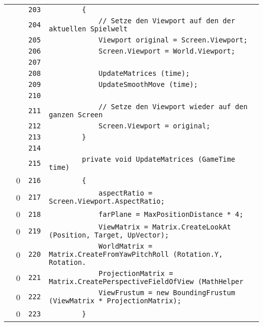 \documentclass[a4paper,10pt]{article}
\begin{document}
\begin{longtable}[l]{lrrl}
\cellcolor{gray} &  & \verb~203~ & \verb~        {~\\
\cellcolor{gray} &  & \verb~204~ & \verb~            // Setze den Viewport auf den der aktuellen Spielwelt~\\
\cellcolor{gray} &  & \verb~205~ & \verb~            Viewport original = Screen.Viewport;~\\
\cellcolor{gray} &  & \verb~206~ & \verb~            Screen.Viewport = World.Viewport;~\\
\cellcolor{gray} &  & \verb~207~ & \verb~~\\
\cellcolor{gray} &  & \verb~208~ & \verb~            UpdateMatrices (time);~\\
\cellcolor{gray} &  & \verb~209~ & \verb~            UpdateSmoothMove (time);~\\
\cellcolor{gray} &  & \verb~210~ & \verb~~\\
\cellcolor{gray} &  & \verb~211~ & \verb~            // Setze den Viewport wieder auf den ganzen Screen~\\
\cellcolor{gray} &  & \verb~212~ & \verb~            Screen.Viewport = original;~\\
\cellcolor{gray} &  & \verb~213~ & \verb~        }~\\
\cellcolor{gray} &  & \verb~214~ & \verb~~\\
\cellcolor{gray} &  & \verb~215~ & \verb~        private void UpdateMatrices (GameTime time)~\\
\cellcolor{red} & 0 & \verb~216~ & \verb~        {~\\
\cellcolor{red} & 0 & \verb~217~ & \verb~            aspectRatio = Screen.Viewport.AspectRatio;~\\
\cellcolor{red} & 0 & \verb~218~ & \verb~            farPlane = MaxPositionDistance * 4;~\\
\cellcolor{red} & 0 & \verb~219~ & \verb~            ViewMatrix = Matrix.CreateLookAt (Position, Target, UpVector);~\\
\cellcolor{red} & 0 & \verb~220~ & \verb~            WorldMatrix = Matrix.CreateFromYawPitchRoll (Rotation.Y, Rotation.~\\
\cellcolor{red} & 0 & \verb~221~ & \verb~            ProjectionMatrix = Matrix.CreatePerspectiveFieldOfView (MathHelper~\\
\cellcolor{red} & 0 & \verb~222~ & \verb~            ViewFrustum = new BoundingFrustum (ViewMatrix * ProjectionMatrix);~\\
\cellcolor{red} & 0 & \verb~223~ & \verb~        }~\\

\end{longtable}
\end{document}
